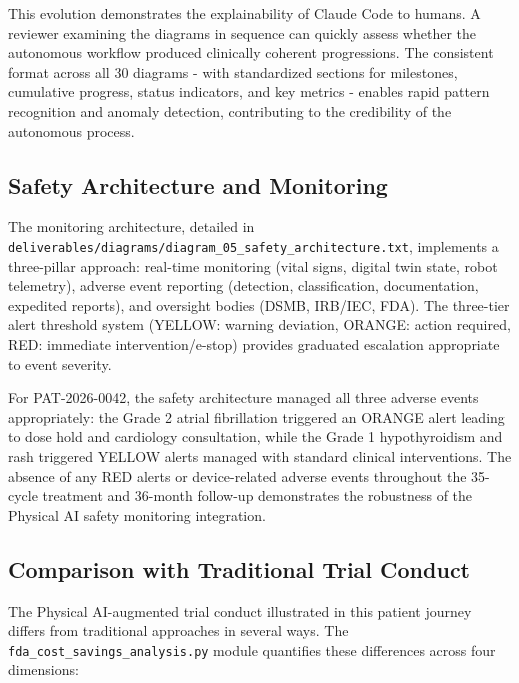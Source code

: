 \documentclass{article}
\begin{document}
This evolution demonstrates the explainability of Claude Code to humans. A reviewer examining the diagrams in sequence can quickly assess whether the autonomous workflow produced clinically coherent progressions. The consistent format across all 30 diagrams - with standardized sections for milestones, cumulative progress, status indicators, and key metrics - enables rapid pattern recognition and anomaly detection, contributing to the credibility of the autonomous process.

\subsection{Safety Architecture and Monitoring}

The monitoring architecture, detailed in \texttt{deliverables/diagrams/diagram\_05\_safety\_architecture.txt}, implements a three-pillar approach: real-time monitoring (vital signs, digital twin state, robot telemetry), adverse event reporting (detection, classification, documentation, expedited reports), and oversight bodies (DSMB, IRB/IEC, FDA). The three-tier alert threshold system (YELLOW: warning deviation, ORANGE: action required, RED: immediate intervention/e-stop) provides graduated escalation appropriate to event severity.

For PAT-2026-0042, the safety architecture managed all three adverse events appropriately: the Grade 2 atrial fibrillation triggered an ORANGE alert leading to dose hold and cardiology consultation, while the Grade 1 hypothyroidism and rash triggered YELLOW alerts managed with standard clinical interventions. The absence of any RED alerts or device-related adverse events throughout the 35-cycle treatment and 36-month follow-up demonstrates the robustness of the Physical AI safety monitoring integration.

\subsection{Comparison with Traditional Trial Conduct}

The Physical AI-augmented trial conduct illustrated in this patient journey differs from traditional approaches in several ways. The \texttt{fda\_cost\_savings\_analysis.py} module quantifies these differences across four dimensions:
\end{document}

